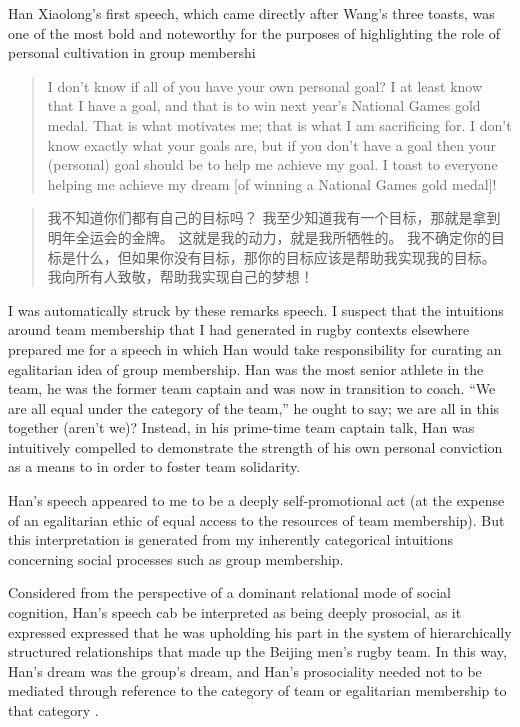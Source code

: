 \begin{CJK}{UTF8}{gbsn}
Han Xiaolong's first speech, which came directly after Wang's three toasts, was one of the most bold and noteworthy for the purposes of highlighting the role of personal cultivation in group membershi
     \begin{quote}
       I don't know if all of you have your own personal goal?  I at least know that I have a goal, and that is to win next year's National Games gold medal.  That is what motivates me; that is what I am sacrificing for.  I don't know exactly what your goals are, but if you don't have a goal then your (personal) goal should be to help me achieve my goal.  I toast to everyone helping me achieve my dream [of winning a National Games gold medal]!
     \end{quote}
     \begin{quote}
         我不知道你们都有自己的目标吗？ 我至少知道我有一个目标，那就是拿到明年全运会的金牌。 这就是我的动力，就是我所牺牲的。 我不确定你的目标是什么，但如果你没有目标，那你的目标应该是帮助我实现我的目标。 我向所有人致敬，帮助我实现自己的梦想！
     \end{quote}

I was automatically struck by these remarks speech. I suspect that the intuitions around team membership that I had generated in rugby contexts elsewhere prepared me for a speech in which Han would take responsibility for curating an egalitarian idea of group membership. Han was the most senior athlete in the team, he was the former team captain and was now in transition to coach.  ``We are all equal under the category of the team,'' he ought to say; we are all in this together (aren't we)?  Instead, in his prime-time team captain talk, Han was intuitively compelled to demonstrate the strength of his own personal conviction as a means to in order to foster team solidarity.

Han's speech appeared to me to be a deeply self-promotional act (at the expense of an egalitarian ethic of equal access to the resources of team membership). But this interpretation is generated from my inherently categorical intuitions concerning social processes such as group membership.

Considered from the perspective of a dominant relational mode of social cognition, Han's speech cab be interpreted as being deeply prosocial, as it expressed expressed that he was upholding his part in the system of hierarchically structured relationships that made up the Beijing men's rugby team.  In this way, Han's dream was the group's dream, and Han's prosociality needed not to be mediated through reference to the category of team or egalitarian membership to that category \citep{Liu2009}.


\end{CJK}
